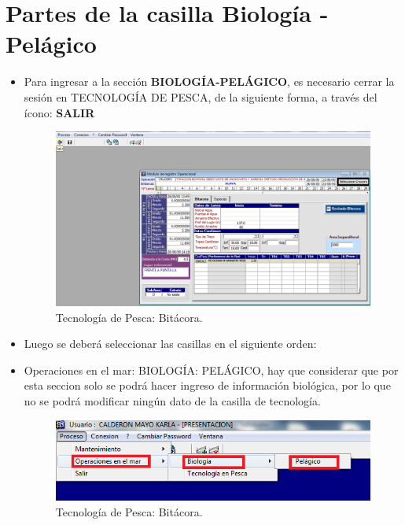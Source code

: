 \documentclass[a4paper,oneside,11pt]{book}
\begin{document}
\newpage
 \section{Partes de la casilla Biología - Pelágico}
 
 \begin{itemize}
 \item [] Para ingresar a la sección \textbf{BIOLOGÍA-PELÁGICO}, es necesario cerrar la sesión en TECNOLOGÍA DE PESCA, de la siguiente forma, a través del ícono: \textbf{SALIR }
 
         
         
\begin{figure} [!h]
\begin{center}
\includegraphics[scale=0.35]{imagen_manual_OPEMAR/salir.png}
\caption{Tecnología de Pesca: Bitácora.}
\end{center}
\end{figure}
         
\item Luego se deberá seleccionar las casillas en el siguiente orden: 
\item [] Operaciones en el mar: BIOLOGÍA: PELÁGICO, hay que considerar que por esta seccion solo se podrá hacer ingreso de información biológica, por lo que no se podrá modificar ningún dato de la casilla de tecnología.

\begin{figure} [!h]
\begin{center}
\includegraphics[scale=0.4]{imagen_manual_OPEMAR/rojo.png}
\caption{Tecnología de Pesca: Bitácora.}
\end{center}
\end{figure}


\end{itemize}
\end{document}
